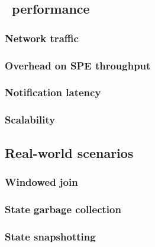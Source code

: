 \subsection{\tracker\ performance} \label{overhead}

\subsubsection{Network traffic}

\subsubsection{Overhead on SPE throughput}

\subsubsection{Notification latency}

\subsubsection{Scalability}

\subsection{Real-world scenarios} \label{real-world-scenarios}

\subsubsection{Windowed join}

\subsubsection{State garbage collection}

\subsubsection{State snapshotting}


